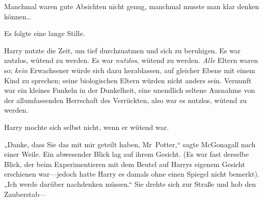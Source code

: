 Manchmal waren gute Absichten nicht genug, manchmal musste man klar denken können…

Es folgte eine lange Stille.

Harry nutzte die Zeit, um tief durchzuatmen und sich zu beruhigen. Es war nutzlos, wütend zu werden. Es war \emph{nutzlos}, wütend zu werden. \emph{Alle} Eltern waren so; \emph{kein} Erwachsener würde sich dazu herablassen, auf gleicher Ebene mit einem Kind zu sprechen; seine biologischen Eltern würden nicht anders sein. Vernunft war ein kleines Funkeln in der Dunkelheit, eine unendlich seltene Ausnahme von der allumfassenden Herrschaft des Verrückten, also war es nutzlos, wütend zu werden.

Harry mochte sich selbst nicht, wenn er wütend war.

„Danke, dass Sie das mit mir geteilt haben, Mr~Potter,“ sagte McGonagall nach einer Weile. Ein abwesender Blick lag auf ihrem Gesicht. (Es war fast derselbe Blick, der beim Experimentieren mit dem Beutel auf Harrys eigenem Gesicht erschienen war—jedoch hatte Harry es damals ohne einen Spiegel nicht bemerkt). „Ich werde darüber nachdenken müssen.“ Sie drehte sich zur Straße und hob den Zauberstab—

